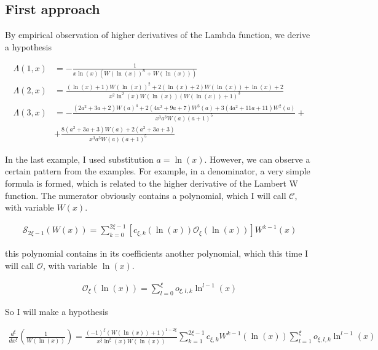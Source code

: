 \section{}

\subsection{First approach}

By empirical observation of higher derivatives 
of the Lambda function, we derive a hypothesis

\begin{align}
      \Lambda(1, x)&=-\frac{1}{x\ln(x)(W(\ln(x))^n+W(\ln(x)))} \\
      \Lambda(2, x)&=\frac{(\ln(x)+1)W(\ln(x))^2 +2(\ln(x)+2)W(\ln(x))
      +\ln(x)+2}{x^2\ln^2(x) W(\ln(x))(W(\ln(x))+1)^3}\\
      \Lambda(3, x)&=-\frac{(2a^2+3a+2)W(a)^4+2(4a^2+9a+7)W^3(a)+3(4a^2
      +11a+11)W^2(a)}{x^3a^3W(a)(a+1)^5}+ \\
      & + \frac{8(a^2+3a+3)W(a)+2(a^2+3a+3)}{x^3a^3W(a)(a+1)^5}
\end{align}

In the last example, I used substitution $a = \ln(x)$. 
However, we can observe a certain pattern from the examples.
For example, in a denominator, a very simple formula is formed, 
which is related to the higher derivative of the Lambert W function.
The numerator obviously contains a polynomial, which I will call
$\mathcal{C}$, with variable $W(x)$.

\begin{align}
     \mathcal{S}_{2\xi-1}(W(x))= \sum_{k=0}^{2\xi-1}\left[c_{\xi, k}
     (\ln(x))\mathcal{O}_\xi(\ln(x))\right]W^{k-1}(x)
\end{align}

this polynomial contains in its coefficients another polynomial, 
which this time I will call \(\mathcal{O}\), with variable \(\ln(x)\).

\begin{align}
     \mathcal{O}_\xi(\ln(x))= \sum_{l=0}^{\xi}o_{\xi, l, k}\ln^{l-1}(x)
\end{align}

So I will make a hypothesis

\begin{conjecture}

     \begin{align}
          \frac{d^\xi}{dx^\xi}\left(\frac{1}{W(\ln(x))}\right) = 
          \frac{(-1)^\xi (W(\ln(x))+1)^{1-2\xi}}{x^\xi \ln^\xi(x) 
          W(\ln(x))}\sum_{k=1}^{2\xi-1}c_{\xi, k}W^{k-1}(\ln(x))
          \sum_{l=1}^{\xi}o_{\xi, l, k}\ln^{l-1}(x)
     \end{align}
     
\end{conjecture}

